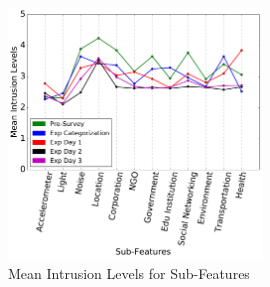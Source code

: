 \begin{figure}[ht!]
\centering
\includegraphics[width=0.6\textwidth,keepaspectratio]{./images/all_sub_mean}
\caption{Mean Intrusion Levels for Sub-Features}
\label{fig:sum_mean}
\end{figure}

